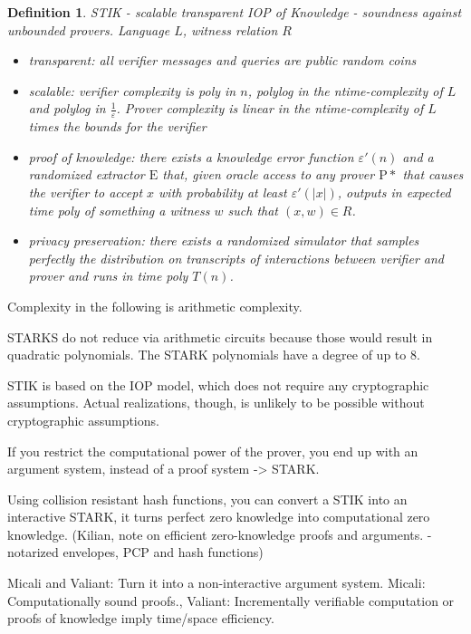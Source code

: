 \documentclass[11pt,letterpaper]{article}
\newtheorem{definition}[dummytheorem]{Definition}
\begin{document}
\begin{definition}
STIK - scalable transparent IOP of Knowledge - soundness against unbounded provers.
Language $L$, witness relation $R$
\begin{itemize}
\item transparent: all verifier messages and queries are public random coins
\item scalable: verifier complexity is poly in $n$, polylog in the ntime-complexity of $L$ and polylog in $\frac{1}{\varepsilon}$.
Prover complexity is linear in the ntime-complexity of $L$ times the bounds for the verifier
\item proof of knowledge: there exists a knowledge error function $\varepsilon'(n)$ and a randomized extractor $\mathrm{E}$ that,
given oracle access to any prover $\mathrm{P}*$ that causes the verifier to accept $x$ with probability at least $\varepsilon'(|x|)$,
outputs in expected time poly of something a witness $w$ such that $(x,w) \in R$.
\item privacy preservation: there exists a randomized simulator that samples perfectly the distribution
on transcripts of interactions between verifier and prover and runs in time poly $T(n)$.
\end{itemize}
\end{definition}

Complexity in the following is arithmetic complexity.

STARKS do not reduce via arithmetic circuits because those would result in quadratic polynomials. The STARK polynomials
have a degree of up to 8.

STIK is based on the IOP model, which does not require any cryptographic assumptions. Actual realizations, though, is unlikely
to be possible without cryptographic assumptions.

If you restrict the computational power of the prover, you end up with an argument system, instead of a proof system -> STARK.

Using collision resistant hash functions, you can convert a STIK into an interactive STARK, it turns perfect zero knowledge into computational zero knowledge.
(Kilian, note on efficient zero-knowledge proofs and arguments. - notarized envelopes, PCP and hash functions)

Micali and Valiant: Turn it into a non-interactive argument system.
Micali: Computationally sound proofs., Valiant: Incrementally verifiable computation or proofs of knowledge imply time/space efficiency.
\end{document}
